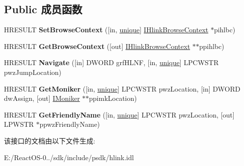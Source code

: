 \subsection*{Public 成员函数}
\begin{DoxyCompactItemize}
\item 
\mbox{\label{interface_i_hlink_target_a5732d89da063c019bbddee3d2c197e76}} 
H\+R\+E\+S\+U\+LT {\bfseries Set\+Browse\+Context} (\mbox{[}in, \hyperlink{interfaceunique}{unique}\mbox{]} \hyperlink{interface_i_hlink_browse_context}{I\+Hlink\+Browse\+Context} $\ast$pihlbc)
\item 
\mbox{\label{interface_i_hlink_target_a54ae0f54f42217d9ecd0a444cc8f9daa}} 
H\+R\+E\+S\+U\+LT {\bfseries Get\+Browse\+Context} (\mbox{[}out\mbox{]} \hyperlink{interface_i_hlink_browse_context}{I\+Hlink\+Browse\+Context} $\ast$$\ast$ppihlbc)
\item 
\mbox{\label{interface_i_hlink_target_ae5eaf9c2a78b8574041f52536617bc5c}} 
H\+R\+E\+S\+U\+LT {\bfseries Navigate} (\mbox{[}in\mbox{]} D\+W\+O\+RD grf\+H\+L\+NF, \mbox{[}in, \hyperlink{interfaceunique}{unique}\mbox{]} L\+P\+C\+W\+S\+TR pwz\+Jump\+Location)
\item 
\mbox{\label{interface_i_hlink_target_a071fc9f368524f395a5f1d787371f130}} 
H\+R\+E\+S\+U\+LT {\bfseries Get\+Moniker} (\mbox{[}in, \hyperlink{interfaceunique}{unique}\mbox{]} L\+P\+C\+W\+S\+TR pwz\+Location, \mbox{[}in\mbox{]} D\+W\+O\+RD dw\+Assign, \mbox{[}out\mbox{]} \hyperlink{interface_i_moniker}{I\+Moniker} $\ast$$\ast$ppimk\+Location)
\item 
\mbox{\label{interface_i_hlink_target_aa146df4904871fe03a89412a19ff7884}} 
H\+R\+E\+S\+U\+LT {\bfseries Get\+Friendly\+Name} (\mbox{[}in, \hyperlink{interfaceunique}{unique}\mbox{]} L\+P\+C\+W\+S\+TR pwz\+Location, \mbox{[}out\mbox{]} L\+P\+W\+S\+TR $\ast$ppwz\+Friendly\+Name)
\end{DoxyCompactItemize}


该接口的文档由以下文件生成\+:\begin{DoxyCompactItemize}
\item 
E\+:/\+React\+O\+S-\/0../sdk/include/psdk/hlink.\+idl\end{DoxyCompactItemize}
